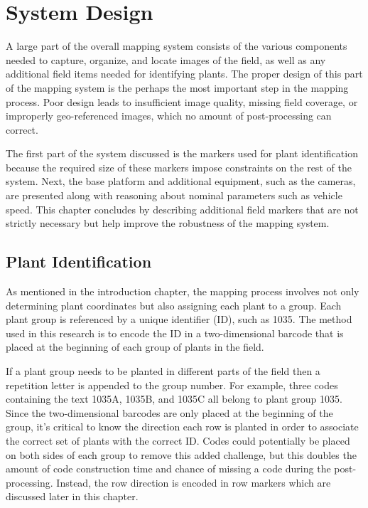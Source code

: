 
\cleardoublepage

\chapter{System Design}
\label{chapter:system_design}

A large part of the overall mapping system consists of the various components needed to capture, organize, and locate images of the field, as well as any additional field items needed for identifying plants.  The proper design of this part of the mapping system is the perhaps the most important step in the mapping process.  Poor design leads to insufficient image quality, missing field coverage, or improperly geo-referenced images, which no amount of post-processing can correct.  

The first part of the system discussed is the markers used for plant identification because the required size of these markers impose constraints on the rest of the system.  Next, the base platform and additional equipment, such as the cameras, are presented along with reasoning about nominal parameters such as vehicle speed.  This chapter concludes by describing additional field markers that are not strictly necessary but help improve the robustness of the mapping system. 

\section{Plant Identification}
\label{section:plantid}

As mentioned in the introduction chapter, the mapping process involves not only determining plant coordinates but also assigning each plant to a group.  Each plant group is referenced by a unique identifier (ID), such as 1035.  The method used in this research is to encode the ID in a two-dimensional barcode that is placed at the beginning of each group of plants in the field. 

If a plant group needs to be planted in different parts of the field then a repetition letter is appended to the group number.  For example, three codes containing the text 1035A, 1035B, and 1035C all belong to plant group 1035.  Since the two-dimensional barcodes are only placed at the beginning of the group, it's critical to know the direction each row is planted in order to associate the correct set of plants with the correct ID.  Codes could potentially be placed on both sides of each group to remove this added challenge, but this doubles the amount of code construction time and chance of missing a code during the post-processing.  Instead, the row direction is encoded in row markers which are discussed later in this chapter.

